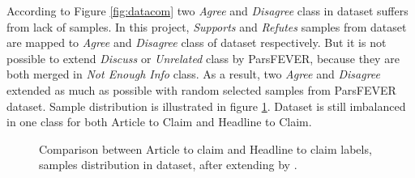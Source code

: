 According to Figure \ref{fig:datacom} two \textit{Agree} and \textit{Disagree} class in \cite{stance_persian} dataset suffers from lack of samples. In this project, \textit{Supports} and \textit{Refutes} samples from \cite{parsfever} dataset are mapped to \textit{Agree} and \textit{Disagree} class of \cite{stance_persian} dataset respectively. 
But it is not possible to extend \textit{Discuss} or \textit{Unrelated} class by ParsFEVER, because they are both merged in \textit{Not Enough Info} class. As a result, two \textit{Agree} and \textit{Disagree} extended as much as possible with random selected samples from ParsFEVER dataset. Sample distribution is illustrated in figure \ref{fig:datab1}. Dataset is still imbalanced in one class for both Article to Claim and Headline to Claim.

\begin{figure}%
	\centering
	\qquad
	\caption{Comparison between Article to claim and Headline to claim labels, samples distribution in \cite{stance_persian} dataset, after extending by \cite{parsfever} .}%
	\label{fig:datab1}%
\end{figure}

